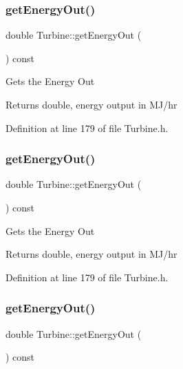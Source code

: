 \subsubsection{\texorpdfstring{get\+Energy\+Out()}{getEnergyOut()}\hspace{0.1cm}{\footnotesize\ttfamily [1/3]}}
{\footnotesize\ttfamily double Turbine\+::get\+Energy\+Out (\begin{DoxyParamCaption}{ }\end{DoxyParamCaption}) const\hspace{0.3cm}{\ttfamily [inline]}}

Gets the Energy Out

\begin{DoxyReturn}{Returns}
double, energy output in M\+J/hr 
\end{DoxyReturn}


Definition at line 179 of file Turbine.\+h.

\mbox{\label{class_turbine_a143fc660274e0d65ccb8fc55cc2caf83}} 
\subsubsection{\texorpdfstring{get\+Energy\+Out()}{getEnergyOut()}\hspace{0.1cm}{\footnotesize\ttfamily [2/3]}}
{\footnotesize\ttfamily double Turbine\+::get\+Energy\+Out (\begin{DoxyParamCaption}{ }\end{DoxyParamCaption}) const\hspace{0.3cm}{\ttfamily [inline]}}

Gets the Energy Out

\begin{DoxyReturn}{Returns}
double, energy output in M\+J/hr 
\end{DoxyReturn}


Definition at line 179 of file Turbine.\+h.

\mbox{\label{class_turbine_a143fc660274e0d65ccb8fc55cc2caf83}} 
\subsubsection{\texorpdfstring{get\+Energy\+Out()}{getEnergyOut()}\hspace{0.1cm}{\footnotesize\ttfamily [3/3]}}
{\footnotesize\ttfamily double Turbine\+::get\+Energy\+Out (\begin{DoxyParamCaption}{ }\end{DoxyParamCaption}) const\hspace{0.3cm}{\ttfamily [inline]}}

